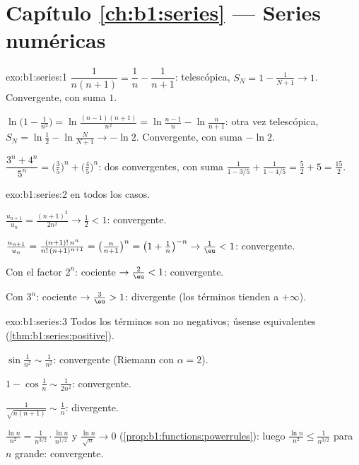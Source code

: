 \section*{Capítulo \ref{ch:b1:series} --- Series numéricas}

\begin{solution}{exo:b1:series:1}
$\dfrac{1}{n(n+1)} = \dfrac1n - \dfrac{1}{n+1}$: telescópica,
$S_N = 1 - \frac{1}{N+1} \to 1$. Convergente, con suma $1$.

$\ln\bigl(1 - \frac{1}{n^2}\bigr) = \ln\frac{(n-1)(n+1)}{n^2} =
\ln\frac{n-1}{n} - \ln\frac{n}{n+1}$: otra vez telescópica,
$S_N = \ln\frac12 - \ln\frac{N}{N+1} \to -\ln 2$. Convergente, con
suma $-\ln 2$.

$\dfrac{3^n + 4^n}{5^n} = \bigl(\frac35\bigr)^n +
\bigl(\frac45\bigr)^n$: dos  convergentes, con suma
$\frac{1}{1 - 3/5} + \frac{1}{1 - 4/5} = \frac52 + 5 = \frac{15}{2}$.
\end{solution}

\begin{solution}{exo:b1:series:2}
 en todos los casos.

$\frac{u_{n+1}}{u_n} = \frac{(n+1)^2}{2n^2} \to \frac12 < 1$:
convergente.

$\frac{u_{n+1}}{u_n} = \frac{(n+1)!\,n^n}{n!\,(n+1)^{n+1}} =
\bigl(\frac{n}{n+1}\bigr)^n = \bigl(1 + \frac1n\bigr)^{-n} \to
\frac1\eu < 1$: convergente.

Con el factor $2^n$: cociente $\to \frac2\eu < 1$: convergente.

Con $3^n$: cociente $\to \frac3\eu > 1$: divergente (los términos
tienden a $+\infty$).
\end{solution}

\begin{solution}{exo:b1:series:3}
Todos los términos son no negativos; úsense equivalentes
(\cref{thm:b1:series:positive}).

$\sin\frac{1}{n^2} \sim \frac{1}{n^2}$: convergente (Riemann con
$\alpha = 2$).

$1 - \cos\frac1n \sim \frac{1}{2n^2}$: convergente.

$\frac{1}{\sqrt{n(n+1)}} \sim \frac1n$: divergente.

$\frac{\ln n}{n^2} = \frac{1}{n^{3/2}}\cdot\frac{\ln n}{n^{1/2}}$ y
$\frac{\ln n}{\sqrt n} \to 0$
(\cref{prop:b1:functions:powerrules}): luego
$\frac{\ln n}{n^2} \leq \frac{1}{n^{3/2}}$ para $n$ grande:
convergente.
\end{solution}


